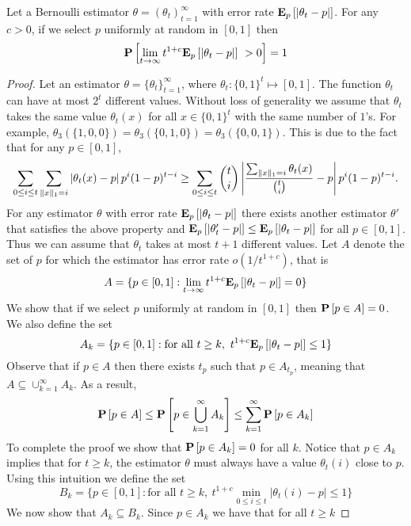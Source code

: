 \begin{lemma}\label{l:estimation_lower_bound}
  Let a Bernoulli estimator $\theta=(\theta_t)_{t=1}^\infty$
  with error rate $\Expnew{p}{|\theta_t  - p |}$.
  For any $c>0$, if we select $p$ uniformly at random in $[0,1]$ then
  \[\Prob{\lim_{t\to \infty} t^{1+c} \Expnew{p}{|\theta_t  - p |}\ > 0}=1\]
\end{lemma}
\begin{proof}
  Let an estimator $\theta = \{\theta_t\}_{t=1}^{\infty}$, where
  $\theta_t: \{0,1\}^t\mapsto [0,1]$.  The function $\theta_t$ can have at most
  $2^t$ different values. Without loss of generality we assume that
  $\theta_t$ takes the same value $\theta_t(x)$ for all $x \in \{0,1\}^t$
  with the same number of $1$'s. For example,
  $\theta_3(\{1,0,0\})=\theta_3(\{0,1,0\})=\theta_3(\{0,0,1\})$.
  This is due to the fact that for any $p \in[0,1]$,
  \[
    \sum_{0 \leq i \leq t} \sum_{\norm{1}{x} = i} \lp| \theta_t(x) - p \rp|
    p^i (1-p)^{t-i} \geq \sum_{0 \leq i \leq t} \binom{t}{i} \lp|
    \frac{\sum_{\norm{1}{x} = i} \theta_t(x)}{\binom{t}{i}}  - p \rp| p^i
    (1-p)^{t-i}.
  \]
  For any estimator $\theta$ with error rate $\Expnew{p}{|\theta_t  - p |}$ there exists another
  estimator $\theta'$ that satisfies the above property and
  $\Expnew{p}{|\theta_t'  - p |} \leq \Expnew{p}{|\theta_t  - p |}$ for all $p \in [0,1]$.
  Thus we can assume that $\theta_t$ takes at most $t+1$ different
  values.
  Let $A$ denote the set of $p$ for which the estimator has error
  rate $o(1/t^{1+c})$, that is
  \[
    A= \{p\in [0,1]: \lim_{t \to \infty} t^{1+c}\Expnew{p}{|\theta_t  - p |}=0\}
  \]
  We show that if we select $p$ uniformly at random in $[0,1]$ then
  $\Prob{p \in A} = 0$.  We also define the set
  \[
    A_k=\{p\in [0,1]: \text{for all }t \geq k,~ t^{1+c}\Expnew{p}{|\theta_t  - p |}\leq 1\}
  \]
  Observe that if $p \in A$ then there exists $t_p$ such that
  $p \in A_{t_p}$, meaning that
  $A \subseteq \cup_{k=1}^{\infty}A_k$.  As a result,
  \[
    \Prob{p \in A} \leq \Prob {p \in\bigcup_{k=1}^{\infty}A_k} \leq
    \sum_{k=1}^{\infty}\Prob{p \in A_k}
  \]
  To complete the proof we show that $\Prob{p \in A_k}=0$ for all $k$.
  Notice that $p \in A_k$ implies that for $t \geq k$, the estimator
  $\theta$ must always have a value $\theta_t(i)$ close to $p$.
  Using this intuition we define the set
  \[
    B_k = \{p \in [0,1]: \text{for all
    }t\geq k,~ t^{1+c}\min_{0\leq i \leq t}|\theta_t(i)-p| \leq 1\}
  \]
  We now show that $A_k \subseteq B_k$.
  Since $p \in A_k$ we have that for all $t\geq k$

\end{proof}
